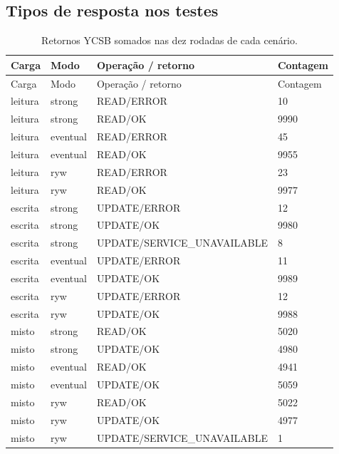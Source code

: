 \subsection{Tipos de resposta nos testes}
\begingroup\small\setlength{\tabcolsep}{4pt}
\begin{longtable}{llll}
\caption{Retornos YCSB somados nas dez rodadas de cada cenário.}\\
\toprule
Carga & Modo & Operação / retorno & Contagem\\\midrule\endfirsthead
\toprule
Carga & Modo & Operação / retorno & Contagem\\\midrule\endhead
\bottomrule\endfoot
leitura & strong & READ/ERROR & 10\\
leitura & strong & READ/OK & 9990\\
leitura & eventual & READ/ERROR & 45\\
leitura & eventual & READ/OK & 9955\\
leitura & ryw & READ/ERROR & 23\\
leitura & ryw & READ/OK & 9977\\
escrita & strong & UPDATE/ERROR & 12\\
escrita & strong & UPDATE/OK & 9980\\
escrita & strong & UPDATE/SERVICE\_UNAVAILABLE & 8\\
escrita & eventual & UPDATE/ERROR & 11\\
escrita & eventual & UPDATE/OK & 9989\\
escrita & ryw & UPDATE/ERROR & 12\\
escrita & ryw & UPDATE/OK & 9988\\
misto & strong & READ/OK & 5020\\
misto & strong & UPDATE/OK & 4980\\
misto & eventual & READ/OK & 4941\\
misto & eventual & UPDATE/OK & 5059\\
misto & ryw & READ/OK & 5022\\
misto & ryw & UPDATE/OK & 4977\\
misto & ryw & UPDATE/SERVICE\_UNAVAILABLE & 1\\
\end{longtable}
\endgroup
